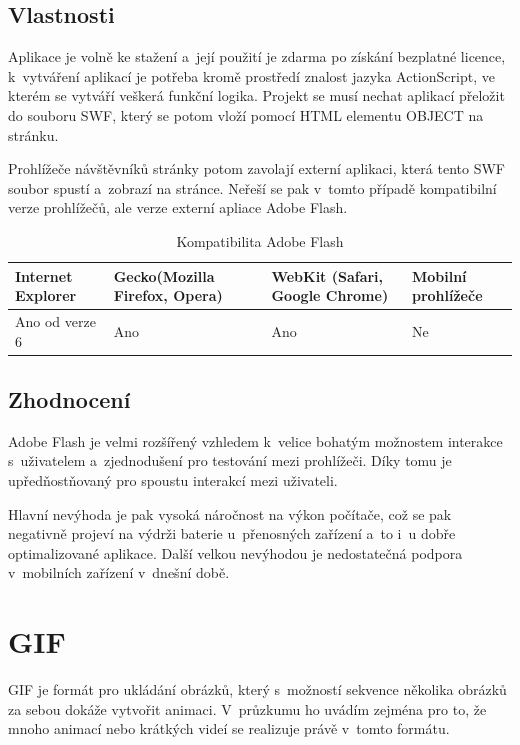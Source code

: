 \subsection*{Vlastnosti}

Aplikace je volně ke stažení a~její použití je zdarma po získání bezplatné licence, k~vytváření aplikací je potřeba kromě prostředí znalost jazyka ActionScript\cite{ActionScript}, ve kterém se vytváří veškerá funkční logika. Projekt se musí nechat aplikací přeložit do souboru SWF\cite{swf}, který se potom vloží pomocí HTML\cite{html5video} elementu OBJECT na stránku. 

Prohlížeče návštěvníků stránky potom zavolají externí aplikaci, která tento SWF\cite{swf} soubor spustí a~zobrazí na stránce. Neřeší se pak v~tomto případě kompatibilní verze prohlížečů, ale verze externí apliace Adobe Flash\cite{flash}.

\begin{table}[h]\centering\footnotesize
	\caption[Kompatibilita Adobe FLash]{Kompatibilita Adobe Flash}\label{tab:research-flash}
	\begin{tabular}{|m{2.5cm}|m{2.5cm}|m{2.5cm}|m{2.5cm}|}\hline
		Internet Explorer & Gecko(Mozilla Firefox, Opera)	& WebKit (Safari, Google Chrome) &  Mobilní prohlížeče
		\tabularnewline \hline \hline 
		Ano od verze 6 &  Ano & Ano & Ne
		\tabularnewline \hline
	\end{tabular}
\end{table}


\subsection*{Zhodnocení}

Adobe Flash\cite{flash} je velmi rozšířený vzhledem k~velice bohatým možnostem interakce s~uživatelem a~zjednodušení pro testování mezi prohlížeči. Díky tomu je upředňostňovaný pro spoustu interakcí mezi uživateli. 

Hlavní nevýhoda je pak vysoká náročnost na výkon počítače, což se pak negativně projeví na výdrži baterie u~přenosných zařízení a~to i~u dobře optimalizované aplikace.  Další velkou nevýhodou je nedostatečná podpora v~mobilních zařízení\cite{mobile} v~dnešní době. 


\section{GIF}

GIF\cite{gif} je formát pro ukládání obrázků, který s~možností sekvence několika obrázků za sebou dokáže vytvořit animaci. V~průzkumu ho uvádím zejména pro to, že mnoho animací nebo krátkých videí se realizuje právě v~tomto formátu.

